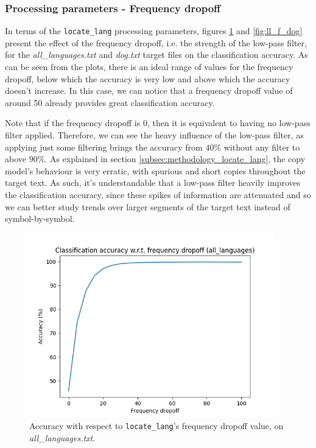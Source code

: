 \documentclass{article}
\begin{document}
\subsubsection{Processing parameters - Frequency dropoff}
\label{subsubsec:results_locate_lang_frequency_dropoff}

In terms of the \texttt{locate_lang} processing parameters, figures \ref{fig:ll_f_all_languages} and \ref{fig:ll_f_dog} present the effect of the frequency dropoff, i.e. the strength of the low-pass filter, for the \textit{all\_languages.txt} and \textit{dog.txt} target files on the classification accuracy.
As can be seen from the plots, there is an ideal range of values for the frequency dropoff, below which the accuracy is very low and above which the accuracy doesn't increase.
In this case, we can notice that a frequency dropoff value of around 50 already provides great classification accuracy.

Note that if the frequency dropoff is 0, then it is equivalent to having no low-pass filter applied.
Therefore, we can see the heavy influence of the low-pass filter, as applying just some filtering brings the accuracy from $40\%$ without any filter to above $90\%$.
As explained in section \ref{subsec:methodology_locate_lang}, the copy model's behaviour is very erratic, with spurious and short copies throughout the target text.
As such, it's understandable that a low-pass filter heavily improves the classification accuracy, since these spikes of information are attenuated and so we can better study trends over larger segments of the target text instead of symbol-by-symbol.

\begin{figure}
    \centering
    \includegraphics[width=0.95\textwidth]{../results/all_languages/ll-f.png}
    \caption{Accuracy with respect to \texttt{locate\_lang}'s frequency dropoff value, on \textit{all\_languages.txt}.}
    \label{fig:ll_f_all_languages}
\end{figure}
\end{document}
